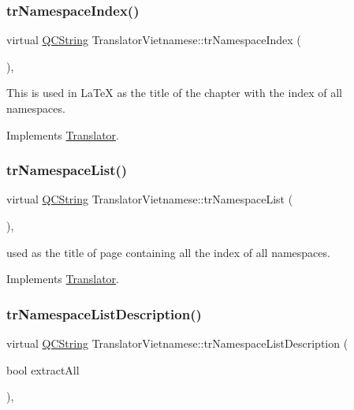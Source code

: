 \subsubsection{\texorpdfstring{trNamespaceIndex()}{trNamespaceIndex()}}
{\footnotesize\ttfamily virtual \mbox{\hyperlink{class_q_c_string}{Q\+C\+String}} Translator\+Vietnamese\+::tr\+Namespace\+Index (\begin{DoxyParamCaption}{ }\end{DoxyParamCaption})\hspace{0.3cm}{\ttfamily [inline]}, {\ttfamily [virtual]}}

This is used in La\+TeX as the title of the chapter with the index of all namespaces. 

Implements \mbox{\hyperlink{class_translator}{Translator}}.

\mbox{\label{class_translator_vietnamese_ae584dc2ff7c68dbb3a74a51b880e204e}} 
\subsubsection{\texorpdfstring{trNamespaceList()}{trNamespaceList()}}
{\footnotesize\ttfamily virtual \mbox{\hyperlink{class_q_c_string}{Q\+C\+String}} Translator\+Vietnamese\+::tr\+Namespace\+List (\begin{DoxyParamCaption}{ }\end{DoxyParamCaption})\hspace{0.3cm}{\ttfamily [inline]}, {\ttfamily [virtual]}}

used as the title of page containing all the index of all namespaces. 

Implements \mbox{\hyperlink{class_translator}{Translator}}.

\mbox{\label{class_translator_vietnamese_a24d9a17613f924d7eeaa2e69be447e85}} 
\subsubsection{\texorpdfstring{trNamespaceListDescription()}{trNamespaceListDescription()}}
{\footnotesize\ttfamily virtual \mbox{\hyperlink{class_q_c_string}{Q\+C\+String}} Translator\+Vietnamese\+::tr\+Namespace\+List\+Description (\begin{DoxyParamCaption}\item[{bool}]{extract\+All }\end{DoxyParamCaption})\hspace{0.3cm}{\ttfamily [inline]}, {\ttfamily [virtual]}}

